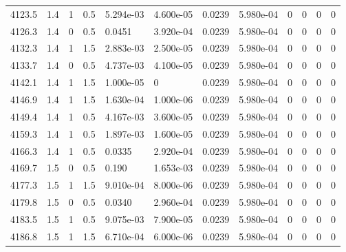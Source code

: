 \documentclass[preview]{standalone}
\begin{document}
{{{{{{{{{{{{{{{{\begin{tabular}{L{1.2cm}C{1.2cm} C{0.3cm}C{0.5cm} C{1.4cm}C{1.4cm} C{1.4cm}C{1.4cm} C{1.6cm}C{1.6cm} C{1.6cm}C{1.6cm}}
  4123.5  &   1.4  & 1     & 0.5 &  5.294e-03  & 4.600e-05  &  0.0239&   5.980e-04& 0 & 0   &  0 & 0  \\ 
  4126.3  &   1.4  & 0     & 0.5 &  0.0451  & 3.920e-04  &  0.0239&   5.980e-04& 0 & 0   &  0 & 0  \\ 
  4132.3  &   1.4  & 1     & 1.5 &  2.883e-03  & 2.500e-05  &  0.0239&   5.980e-04& 0 & 0   &  0 & 0  \\ 
  4133.7  &   1.4  & 0     & 0.5 &  4.737e-03  & 4.100e-05  &  0.0239&   5.980e-04& 0 & 0   &  0 & 0  \\ 
  4142.1  &   1.4  & 1     & 1.5 &  1.000e-05  & 0  &  0.0239&   5.980e-04& 0 & 0   &  0 & 0  \\ 
  4146.9  &   1.4  & 1     & 1.5 &  1.630e-04  & 1.000e-06  &  0.0239&   5.980e-04& 0 & 0   &  0 & 0  \\ 
  4149.4  &   1.4  & 1     & 0.5 &  4.167e-03  & 3.600e-05  &  0.0239&   5.980e-04& 0 & 0   &  0 & 0  \\ 
  4159.3  &   1.4  & 1     & 0.5 &  1.897e-03  & 1.600e-05  &  0.0239&   5.980e-04& 0 & 0   &  0 & 0  \\ 
  4166.3  &   1.4  & 1     & 0.5 &  0.0335  & 2.920e-04  &  0.0239&   5.980e-04& 0 & 0   &  0 & 0  \\ 
  4169.7  &   1.5  & 0     & 0.5 &  0.190  & 1.653e-03  &  0.0239&   5.980e-04& 0 & 0   &  0 & 0  \\ 
  4177.3  &   1.5  & 1     & 1.5 &  9.010e-04  & 8.000e-06  &  0.0239&   5.980e-04& 0 & 0   &  0 & 0  \\ 
  4179.8  &   1.5  & 0     & 0.5 &  0.0340  & 2.960e-04  &  0.0239&   5.980e-04& 0 & 0   &  0 & 0  \\ 
  4183.5  &   1.5  & 1     & 0.5 &  9.075e-03  & 7.900e-05  &  0.0239&   5.980e-04& 0 & 0   &  0 & 0  \\ 
  4186.8  &   1.5  & 1     & 1.5 &  6.710e-04  & 6.000e-06  &  0.0239&   5.980e-04& 0 & 0   &  0 & 0  \\ 
\hline 
\end{tabular} 

}}}}}}}}}}}}}}}}
\end{document}
